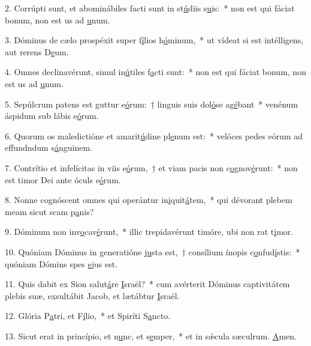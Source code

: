 2. Corrúpti sunt, et abominábiles facti sunt in st\uline{ú}diis s\uline{u}is:~* non est qui fáciat bonum, non est us ad \uline{u}num.\par 
3. Dóminus de cælo prospéxit super f\uline{í}lios h\uline{ó}minum,~* ut vídeat si est intélligens, aut rerens D\uline{e}um.\par 
4. Omnes declinavérunt, simul in\uline{ú}tiles f\uline{a}cti sunt:~* non est qui fáciat bonum, non est us ad \uline{u}num.\par 
5. Sepúlcrum patens est guttur e\uline{ó}rum:~† linguis suis dol\uline{ó}se ag\uline{é}bant~* venénum áspidum sub lábis e\uline{ó}rum.\par 
6. Quorum os maledictióne et amarit\uline{ú}dine pl\uline{e}num est:~* velóces pedes eórum ad effundndum s\uline{á}nguinem.\par 
7. Contrítio et infelícitas in viis e\uline{ó}rum,~† et viam pacis non c\uline{o}gnov\uline{é}runt:~* non est timor Dei ante óculs e\uline{ó}rum.\par 
8. Nonne cognóscent omnes qui operántur in\uline{i}quit\uline{á}tem,~* qui dévorant plebem meam sicut scam p\uline{a}nis?\par 
9. Dóminum non inv\uline{o}cav\uline{é}runt,~* illic trepidavérunt timóre, ubi non rat t\uline{i}mor.\par 
10. Quóniam Dóminus in generatióne \uline{ju}sta est,~† consílium ínopis c\uline{o}nfud\uline{í}stis:~* quóniam Dómins spes \uline{e}jus est.\par 
11. Quis dabit ex Sion salut\uline{á}re \uline{I}sraël?~* cum avérterit Dóminus captivitátem plebis suæ, exsultábit Jacob, et lætábtur \uline{I}sraël.\par 
12. Glória P\uline{a}tri, et F\uline{í}lio,~* et Spiríti S\uline{a}ncto.\par 
13. Sicut erat in princípio, et n\uline{u}nc, et s\uline{e}mper,~* et in sǽcula sæculrum. \uline{A}men.\par 
